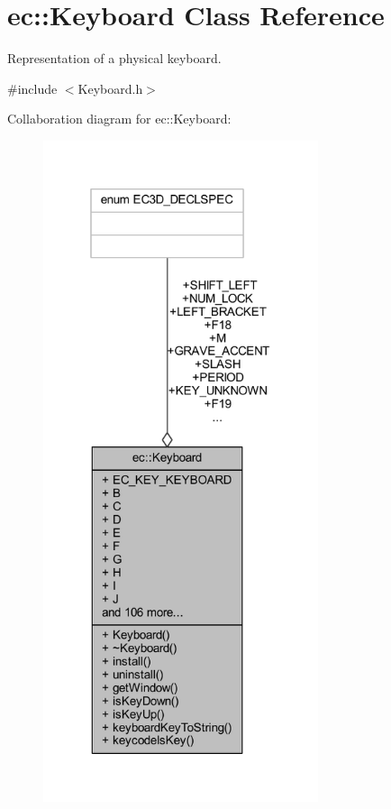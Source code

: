 \hypertarget{classec_1_1_keyboard}{}\section{ec\+:\+:Keyboard Class Reference}
\label{classec_1_1_keyboard}


Representation of a physical keyboard.  




{\ttfamily \#include $<$Keyboard.\+h$>$}



Collaboration diagram for ec\+:\+:Keyboard\+:\nopagebreak
\begin{figure}[H]
\begin{center}
\leavevmode
\includegraphics[height=550pt]{classec_1_1_keyboard__coll__graph}
\end{center}
\end{figure}
